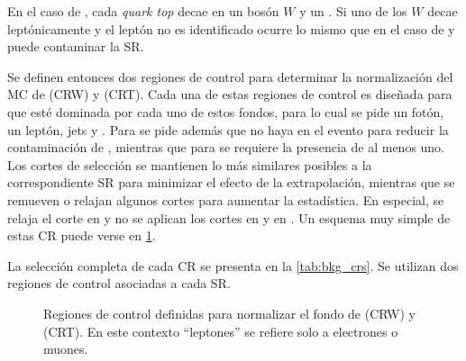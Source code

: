 En el caso de {\ttgam}, cada \emph{quark top} decae en un bosón $W$ y un
{\bjet}. Si uno de los $W$ decae leptónicamente y el leptón no es identificado
ocurre lo mismo que en el caso de {\wgam} y puede contaminar la SR.

Se definen entonces dos regiones de control para determinar la normalización del
MC de {\wgam} (CRW) y {\ttgam} (CRT). Cada una de estas regiones de control es
diseñada para que esté dominada por cada uno de estos fondos, para lo cual se
pide un fotón, un leptón, jets y \met. Para {\CRW} se pide además que no haya
{\bjets} en el evento para reducir la contaminación de {\ttgam}, mientras que
para {\CRT} se requiere la presencia de al menos uno.
Los cortes de selección se mantienen lo
más similares posibles a la correspondiente SR para minimizar el efecto de la
extrapolación, mientras que se remueven o relajan
algunos cortes para aumentar la estadística. En especial, se relaja el corte en
{\met} y no se aplican los cortes en {\HT} y en {\rt}. Un esquema muy simple de
estas CR puede verse en \cref{fig:bkg_crt_crw}.

La selección completa de cada CR se presenta en la \cref{tab:bkg_crs}. Se utilizan
dos regiones de control asociadas a cada SR.

\begin{figure}[!htbp]
  \centering

  \resizebox{0.5\textwidth}{!}{}

  \caption{Regiones de control definidas para normalizar el fondo de
    {\wgam} (CRW) y {\ttgam} (CRT). En este contexto ``leptones'' se
    refiere solo a electrones o muones.}
  \label{fig:bkg_crt_crw}
\end{figure}



